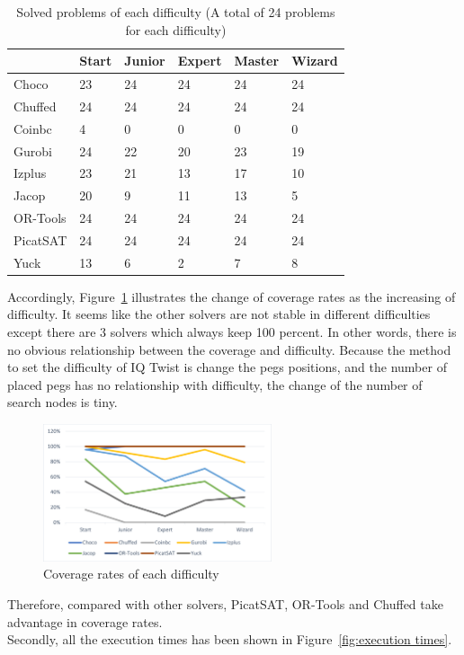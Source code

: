 \begin{table}[htbp]
\centering
\caption{Solved problems of each difficulty (A total of 24 problems for each difficulty)}
\label{tab:solvedproblemforeach difficulty}
\begin{tabular}{|l|l|l|l|l|l|}
\hline
	    &Start&	Junior&	Expert&	Master&	Wizard\\
\hline
Choco   &23   &24 &24 &24 &24\\
\hline
Chuffed	&24   &24 &24 &24 &24\\
\hline
Coinbc	&4    &0  &0  &	0 &0\\
\hline
Gurobi	&24   &22 &20 &	23&19\\
\hline
Izplus	&23   &21 &13 &	17&10\\
\hline
Jacop	&20   &9  &11 &13 &5\\
\hline
OR-Tools	&24   &24 &24 &	24&24\\
\hline
PicatSAT&24   &24 &24 &24 &24\\
\hline
Yuck    &13	  &6  &2  &7  &8\\
\hline
\end{tabular}
\end{table}
Accordingly, Figure~\ref{fig:comparisonIQtwist} illustrates the change of coverage rates as the increasing of difficulty. It seems like the other solvers are not stable in different difficulties except there are 3 solvers which always keep 100 percent. In other words, there is no obvious relationship between the coverage and difficulty. Because the method to set the difficulty of IQ Twist is change the pegs positions, and the number of placed pegs has no relationship with difficulty, the change of the number of search nodes is tiny.
\begin{figure}[H]
    \centering
    \includegraphics[width=0.6\textwidth]{figs/separated coverage.png}
    \caption{Coverage rates of each difficulty}
    \label{fig:comparisonIQtwist}
\end{figure}
Therefore, compared with other solvers, PicatSAT, OR-Tools and Chuffed take advantage in coverage rates.
\\Secondly, all the execution times has been shown in Figure~\ref{fig:execution times}.
